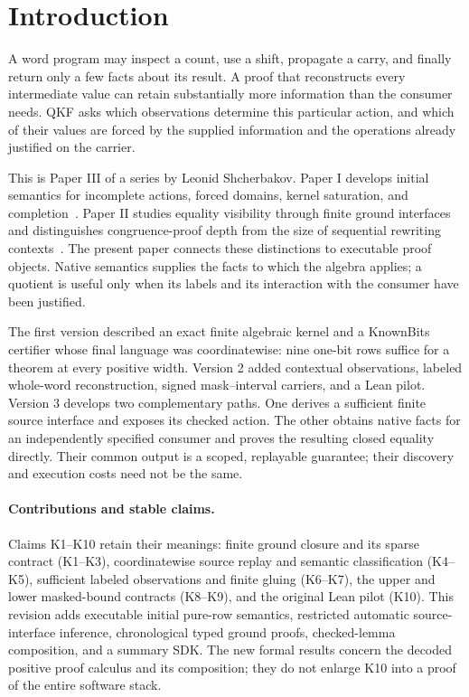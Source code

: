 \section{Introduction}\label{sec:intro}

A word program may inspect a count, use a shift, propagate a carry, and finally return only a few facts about its result. A proof that reconstructs every intermediate value can retain substantially more information than the consumer needs. QKF asks which observations determine this particular action, and which of their values are forced by the supplied information and the operations already justified on the carrier.

This is Paper III of a series by Leonid Shcherbakov. Paper I develops initial semantics for incomplete actions, forced domains, kernel saturation, and completion~\cite{ShcherbakovI}. Paper II studies equality visibility through finite ground interfaces and distinguishes congruence-proof depth from the size of sequential rewriting contexts~\cite{ShcherbakovII}. The present paper connects these distinctions to executable proof objects. Native semantics supplies the facts to which the algebra applies; a quotient is useful only when its labels and its interaction with the consumer have been justified.

The first version described an exact finite algebraic kernel and a KnownBits certifier whose final language was coordinatewise: nine one-bit rows suffice for a theorem at every positive width. Version 2 added contextual observations, labeled whole-word reconstruction, signed mask--interval carriers, and a Lean pilot. Version 3 develops two complementary paths. One derives a sufficient finite source interface and exposes its checked action. The other obtains native facts for an independently specified consumer and proves the resulting closed equality directly. Their common output is a scoped, replayable guarantee; their discovery and execution costs need not be the same.

\paragraph{Contributions and stable claims.}
Claims K1--K10 retain their meanings: finite ground closure and its sparse contract (K1--K3), coordinatewise source replay and semantic classification (K4--K5), sufficient labeled observations and finite gluing (K6--K7), the upper and lower masked-bound contracts (K8--K9), and the original Lean pilot (K10). This revision adds executable initial pure-row semantics, restricted automatic source-interface inference, chronological typed ground proofs, checked-lemma composition, and a summary SDK. The new formal results concern the decoded positive proof calculus and its composition; they do not enlarge K10 into a proof of the entire software stack.

